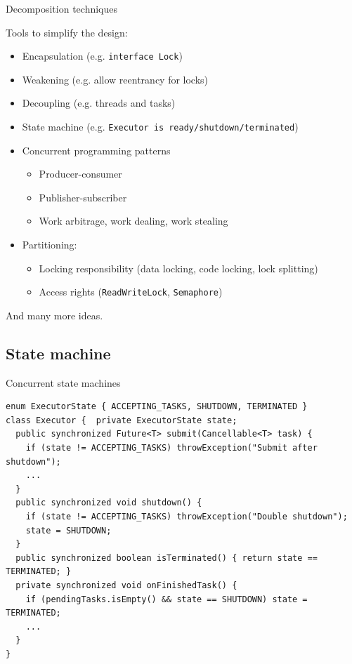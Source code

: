 \begin{frame}[fragile]{Decomposition techniques}

Tools to simplify the design:
\begin{itemize}
    \item Encapsulation (e.g. \texttt{interface Lock})
    \item Weakening (e.g. allow reentrancy for locks)
    \item Decoupling (e.g. threads and tasks)
    \item State machine (e.g. \texttt{Executor is ready/shutdown/terminated})
    \item Concurrent programming patterns
    \begin{itemize}
        \item Producer-consumer
        \item Publisher-subscriber
        \item Work arbitrage, work dealing, work stealing
    \end{itemize}
    \item Partitioning:
    \begin{itemize}
        \item Locking responsibility (data locking, code locking, lock splitting)
        \item Access rights (\texttt{ReadWriteLock}, \texttt{Semaphore})
    \end{itemize}
\end{itemize}

\pause
\pause

And many more ideas.
\end{frame}

\subsection{State machine}
\showTOCSub

\begin{frame}[fragile]{Concurrent state machines}

\begin{verbatim}
enum ExecutorState { ACCEPTING_TASKS, SHUTDOWN, TERMINATED }
class Executor {  private ExecutorState state;
  public synchronized Future<T> submit(Cancellable<T> task) {
    if (state != ACCEPTING_TASKS) throwException("Submit after shutdown");
    ...
  }
  public synchronized void shutdown() {
    if (state != ACCEPTING_TASKS) throwException("Double shutdown");
    state = SHUTDOWN;
  }
  public synchronized boolean isTerminated() { return state == TERMINATED; }
  private synchronized void onFinishedTask() {
    if (pendingTasks.isEmpty() && state == SHUTDOWN) state = TERMINATED;
    ...
  }
}
\end{verbatim}
\end{frame}

